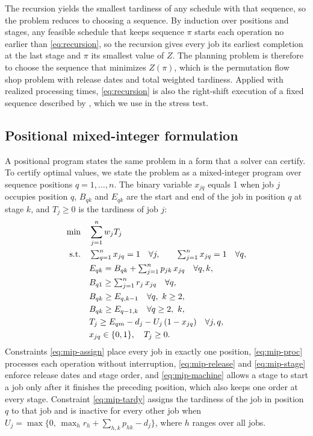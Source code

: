 \sumpara The recursion yields the smallest tardiness of any schedule with that sequence, so the problem reduces to choosing a sequence. \sumparaend
\fin By induction over positions and stages, any feasible schedule that keeps sequence $\pi$ starts each operation no earlier than \eqref{eq:recursion}, so the recursion gives every job its earliest completion at the last stage and $\pi$ its smallest value of $Z$. \fine
\fin The planning problem is therefore to choose the sequence that minimizes $Z(\pi)$, which is the permutation flow shop problem with release dates and total weighted tardiness. \fine
\fin Applied with realized processing times, \eqref{eq:recursion} is also the right-shift execution of a fixed sequence described by \citet{aytug2005executing}, which we use in the stress test. \fine

\subsection{Positional mixed-integer formulation}\label{sec:mip}

\sumpara A positional program states the same problem in a form that a solver can certify. \sumparaend
\fin To certify optimal values, we state the problem as a mixed-integer program over sequence positions $q = 1, \ldots, n$. \fine
\fin The binary variable $x_{jq}$ equals 1 when job $j$ occupies position $q$, $B_{qk}$ and $E_{qk}$ are the start and end of the job in position $q$ at stage $k$, and $T_j \geq 0$ is the tardiness of job $j$: \fine
\begin{align}
\min \quad & \sum_{j=1}^{n} w_j T_j \label{eq:mip-obj}\\
\text{s.t.} \quad & \textstyle\sum_{q=1}^{n} x_{jq} = 1 \quad \forall j, \qquad \sum_{j=1}^{n} x_{jq} = 1 \quad \forall q, \label{eq:mip-assign}\\
& E_{qk} = B_{qk} + \textstyle\sum_{j=1}^{n} p_{jk}\, x_{jq} \quad \forall q, k, \label{eq:mip-proc}\\
& B_{q1} \geq \textstyle\sum_{j=1}^{n} r_j\, x_{jq} \quad \forall q, \label{eq:mip-release}\\
& B_{qk} \geq E_{q,k-1} \quad \forall q,\ k \geq 2, \label{eq:mip-stage}\\
& B_{qk} \geq E_{q-1,k} \quad \forall q \geq 2,\ k, \label{eq:mip-machine}\\
& T_j \geq E_{qm} - d_j - U_j\,(1 - x_{jq}) \quad \forall j, q, \label{eq:mip-tardy}\\
& x_{jq} \in \{0,1\}, \quad T_j \geq 0. \notag
\end{align}
\fin Constraints \eqref{eq:mip-assign} place every job in exactly one position, \eqref{eq:mip-proc} processes each operation without interruption, \eqref{eq:mip-release} and \eqref{eq:mip-stage} enforce release dates and stage order, and \eqref{eq:mip-machine} allows a stage to start a job only after it finishes the preceding position, which also keeps one order at every stage. \fine
\fin Constraint \eqref{eq:mip-tardy} assigns the tardiness of the job in position $q$ to that job and is inactive for every other job when $U_j = \max\{0,\, \max_h r_h + \sum_{h,k} p_{hk} - d_j\}$, where $h$ ranges over all jobs. \fine

